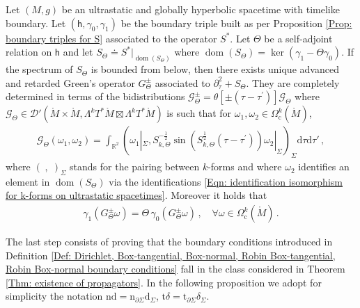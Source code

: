 \begin{theorem}\label{Thm: existence of propagators}
	Let $(M,g)$ be an ultrastatic and globally hyperbolic spacetime with timelike boundary.
	Let $(\mathsf{h},\gamma_0,\gamma_1)$ be the boundary triple built as per Proposition \ref{Prop: boundary triples for S} associated to the operator $S^*$. Let $\Theta$ be a self-adjoint relation on $\mathsf{h}$ and let $S_\Theta\doteq S^*|_{\operatorname{dom}(S_\Theta)}$ where $\operatorname{dom}(S_\Theta)=\ker(\gamma_1-\Theta\gamma_0)$.
	If the spectrum of $S_\Theta$ is bounded from below, then there exists unique advanced and retarded Green's operator $G^\pm_\Theta$ associated to $\partial_\tau^2+S_\Theta$.
	They are completely determined in terms of the bidistributions $\mathcal{G}^\pm_\Theta=\theta[\pm(\tau-\tau^\prime)]\mathcal{G}_\Theta$ where $\mathcal{G}_\Theta\in \mathcal{D}'(\mathring{M}\times\mathring{M},\Lambda^kT^* \mathring{M}\boxtimes\Lambda^k T^*\mathring{M})$ is such that for $\omega_1,\omega_2\in \Omega_{\mathrm{c}}^k(\mathring{M})$,
	\begin{align*}
	\mathcal{G}_\Theta(\omega_1,\omega_2)=
	\int_{\mathbb{R}^2}
	\left(\omega_1|_{\Sigma},S^{-\frac{1}{2}}_{k,\Theta}\sin(S^{\frac{1}{2}}_{k,\Theta}(\tau-\tau^\prime))\omega_2|_{\Sigma}\right)_{\Sigma}
	\mathrm{d}\tau\mathrm{d}\tau'\,,
	\end{align*}
	where $(\;,\;)_\Sigma$ stands for the pairing between $k$-forms and where $\omega_2$ identifies an element in $\operatorname{dom}(S_\Theta)$ via the identifications \eqref{Eqn: identification isomorphism for k-forms on ultrastatic spacetimes}.
	Moreover it holds that 
	\begin{align}
	\gamma_1\left(G^\pm_\Theta\omega\right)=
	\Theta\,\gamma_0\left(G^\pm_\Theta\omega\right)\,,\quad
	\forall\omega\in \Omega_{\mathrm{c}}^k(\mathring{M})\,.
	\end{align}
\end{theorem}

The last step consists of proving that the boundary conditions introduced in Definition \ref{Def: Dirichlet, Box-tangential, Box-normal, Robin Box-tangential, Robin Box-normal boundary conditions} fall in the class considered in Theorem \ref{Thm: existence of propagators}. In the following proposition we adopt for simplicity the notation $\mathrm{nd}=\mathrm{n}_{\partial\Sigma}\mathrm{d}_{\Sigma}$, $\mathrm{t}\delta=\mathrm{t}_{\partial\Sigma}\delta_\Sigma$.

